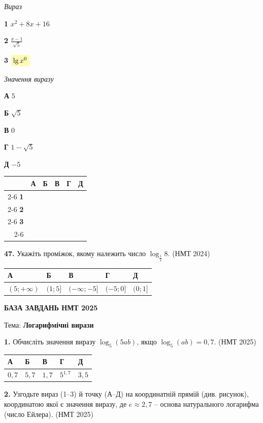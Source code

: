\documentclass[14pt]{extarticle}
\newcommand{\answerGrid}{
    \begingroup
    \renewcommand{\arraystretch}{1.3} 
    \setlength{\tabcolsep}{7pt} 
    \begin{tabular}{r|c|c|c|c|c|}
         \multicolumn{1}{c}{} & \multicolumn{1}{c}{\textbf{А}} & \multicolumn{1}{c}{\textbf{Б}} & \multicolumn{1}{c}{\textbf{В}} & \multicolumn{1}{c}{\textbf{Г}} & \multicolumn{1}{c}{\textbf{Д}} \\ \cline{2-6}
         \textbf{1} & & & & & \\ \cline{2-6}
         \textbf{2} & & & & & \\ \cline{2-6}
         \textbf{3} & & & & & \\ \cline{2-6}
    \end{tabular}
    \endgroup
}
\newcommand{\matchingLayout}[3]{
    \noindent
    \begin{minipage}[t]{0.40\textwidth}
        #1
    \end{minipage}%
    \hfill
    \begin{minipage}[t]{0.28\textwidth}
        #2
    \end{minipage}%
    \hfill
    \begin{minipage}[t]{0.30\textwidth}
        \vspace{0pt}
        \begin{flushright}
        #3
        \end{flushright}
    \end{minipage}
}
\newcommand{\answerTable}[5]{
\begin{center}
\begin{tabular}{|*{5}{>{\centering\arraybackslash}m{2.8cm}|}}
\hline
\rule[-0.3cm]{0pt}{0.8cm}\textbf{А} & \textbf{Б} & \textbf{В} & \textbf{Г} & \textbf{Д} \\
\hline
\rule[-0.4cm]{0pt}{1.0cm}#1 & \rule[-0.4cm]{0pt}{1.0cm}#2 & \rule[-0.4cm]{0pt}{1.0cm}#3 & \rule[-0.4cm]{0pt}{1.0cm}#4 & \rule[-0.4cm]{0pt}{1.0cm}#5 \\
\hline
\end{tabular}
\end{center}
}
\newcommand{\nmtyear}[1]{\hfill{\small\color{yearcolor}(НМТ #1)}}
\begin{document}
\matchingLayout{\textit{Вираз}

\textbf{1} \quad $x^2 + 8x + 16$

\textbf{2} \quad $\displaystyle\frac{x - 1}{\sqrt{5}}$

\textbf{3} \quad $\colorbox{yellow!30}{$\lg x^0$}$
}{
\textit{Значення виразу}

\textbf{А} \quad $5$

\textbf{Б} \quad $\sqrt{5}$

\textbf{В} \quad $0$

\textbf{Г} \quad $1 - \sqrt{5}$

\textbf{Д} \quad $-5$
}{
\answerGrid
}

\vspace{0.8cm}

\noindent\textbf{47.} Укажіть проміжок, якому належить число $\log_{\frac{1}{2}} 8$. \nmtyear{2024}
\vspace{0.3cm}

\answerTable{$(5; +\infty)$}{$(1; 5]$}{$(-\infty; -5]$}{$(-5; 0]$}{$(0; 1]$}




\newpage

\begin{center}
{\Large\textbf{\color{headerblue}БАЗА ЗАВДАНЬ НМТ 2025}}
\end{center}

\begin{center}
{\large Тема: \textbf{Логарифмічні вирази}}
\end{center}

\vspace{0.5cm}

\noindent\textbf{1.} Обчисліть значення виразу $\log_5 (5ab)$, якщо $\log_5 (ab) = 0{,}7$. \nmtyear{2025}
\vspace{0.3cm}

\answerTable{$0{,}7$}{$5{,}7$}{$1{,}7$}{$5^{1{,}7}$}{$3{,}5$}

\vspace{0.5cm}

\noindent\textbf{2.} Узгодьте вираз (1--3) й точку (А--Д) на координатній прямій (див. рисунок), координатою якої є значення виразу, де $e \approx 2{,}7$ -- основа натурального логарифма (число Ейлера). \nmtyear{2025}
\vspace{0.3cm}

\begin{center}
\end{center}
\end{document}
